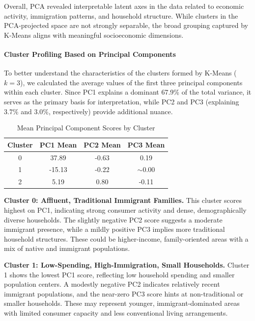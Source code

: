 \documentclass{article}
\begin{document}
Overall, PCA revealed interpretable latent axes in the data related to economic activity, immigration patterns, and household structure. While clusters in the PCA-projected space are not strongly separable, the broad grouping captured by K-Means aligns with meaningful socioeconomic dimensions.

\paragraph{Cluster Profiling Based on Principal Components}

To better understand the characteristics of the clusters formed by K-Means ($k=3$), we calculated the average values of the first three principal components within each cluster. Since PC1 explains a dominant 67.9\% of the total variance, it serves as the primary basis for interpretation, while PC2 and PC3 (explaining 3.7\% and 3.0\%, respectively) provide additional nuance.

\begin{table}[H]
    \centering
    \caption{Mean Principal Component Scores by Cluster}
    \label{tab:cluster-pc-means}
    \begin{tabular}{@{}cccc@{}}
        \toprule
        Cluster & PC1 Mean & PC2 Mean & PC3 Mean \\
        \midrule
        0 & 37.89 & -0.63 & 0.19 \\
        1 & -15.13 & -0.22 & $\sim$0.00 \\
        2 & 5.19 & 0.80 & -0.11 \\
        \bottomrule
    \end{tabular}
\end{table}

\textbf{Cluster 0: Affluent, Traditional Immigrant Families.}  
This cluster scores highest on PC1, indicating strong consumer activity and dense, demographically diverse households. The slightly negative PC2 score suggests a moderate immigrant presence, while a mildly positive PC3 implies more traditional household structures. These could be higher-income, family-oriented areas with a mix of native and immigrant populations.

\textbf{Cluster 1: Low-Spending, High-Immigration, Small Households.}  
Cluster 1 shows the lowest PC1 score, reflecting low household spending and smaller population centers. A modestly negative PC2 indicates relatively recent immigrant populations, and the near-zero PC3 score hints at non-traditional or smaller households. These may represent younger, immigrant-dominated areas with limited consumer capacity and less conventional living arrangements.
\end{document}
